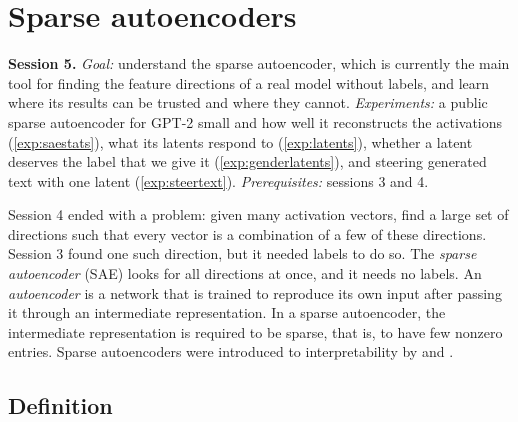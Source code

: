 \section{Sparse autoencoders}
\label{sec:sae}

\begin{sessioncard}
\textbf{Session 5.} \emph{Goal:} understand the sparse autoencoder, which is currently the main tool for finding
the feature directions of a real model without labels, and learn where its results can be trusted and where they
cannot.
\emph{Experiments:} a public sparse autoencoder for GPT-2 small and how well it reconstructs the activations
(\cref{exp:saestats}), what its latents respond to (\cref{exp:latents}), whether a latent deserves the label that we
give it (\cref{exp:genderlatents}), and steering generated text with one latent (\cref{exp:steertext}).
\emph{Prerequisites:} sessions 3 and 4.
\end{sessioncard}

Session 4 ended with a problem: given many activation vectors, find a large set of directions such that every
vector is a combination of a few of these directions. Session 3 found one such direction, but it needed labels to
do so. The \emph{sparse autoencoder} (SAE) looks for all directions at once, and it needs no labels. An
\emph{autoencoder} is a network that is trained to reproduce its own input after passing it through an
intermediate representation. In a sparse autoencoder, the intermediate representation is required to be sparse,
that is, to have few nonzero entries. Sparse autoencoders were introduced to interpretability by
\citet{bricken2023monosemanticity} and \citet{cunningham2024sparse}.

\subsection{Definition}

